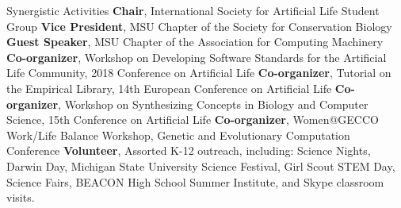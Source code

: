 \begin{rubric}{Synergistic Activities}
%
\entry*[2016 -- Present] \textbf{Chair}, International Society for Artificial Life Student Group 
%
\entry*[2015 -- 2017] \textbf{Vice President}, MSU Chapter of the Society for Conservation Biology 
%
\entry*[2016 -- 2018] \textbf{Guest Speaker}, MSU Chapter of the Association for Computing Machinery
%
\entry*[2018] \textbf{Co-organizer}, Workshop on Developing Software Standards for the Artificial Life Community, 2018 Conference on Artificial Life
%
\entry*[2017] \textbf{Co-organizer}, Tutorial on the Empirical Library, 14th European Conference on Artificial Life
%
\entry*[2016] \textbf{Co-organizer}, Workshop on Synthesizing Concepts in Biology and Computer Science, 15th Conference on Artificial Life 
%
\entry*[2015] \textbf{Co-organizer}, Women@GECCO Work/Life Balance Workshop, Genetic and Evolutionary Computation Conference 
%
\entry*[2014 -- Present] \textbf{Volunteer}, Assorted K-12 outreach, including: Science Nights, Darwin Day, Michigan State University Science Festival, Girl Scout STEM Day, Science Fairs, BEACON High School Summer Institute, and Skype classroom visits.  
%
\vspace{-0.25cm} 


\\


\end{rubric}